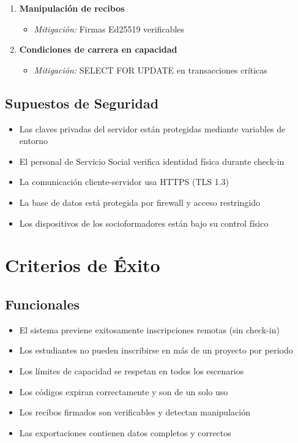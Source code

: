 \documentclass[12pt,a4paper]{article}
\begin{document}
\begin{enumerate}
    \item \textbf{Manipulación de recibos}
    \begin{itemize}
        \item \textit{Mitigación:} Firmas Ed25519 verificables
    \end{itemize}
    
    \item \textbf{Condiciones de carrera en capacidad}
    \begin{itemize}
        \item \textit{Mitigación:} SELECT FOR UPDATE en transacciones críticas
    \end{itemize}
\end{enumerate}

\subsection{Supuestos de Seguridad}

\begin{itemize}[leftmargin=*]
    \item Las claves privadas del servidor están protegidas mediante variables de entorno
    \item El personal de Servicio Social verifica identidad física durante check-in
    \item La comunicación cliente-servidor usa HTTPS (TLS 1.3)
    \item La base de datos está protegida por firewall y acceso restringido
    \item Los dispositivos de los socioformadores están bajo su control físico
\end{itemize}

\section{Criterios de Éxito}

\subsection{Funcionales}

\begin{itemize}[leftmargin=*]
    \item El sistema previene exitosamente inscripciones remotas (sin check-in)
    \item Los estudiantes no pueden inscribirse en más de un proyecto por periodo
    \item Los límites de capacidad se respetan en todos los escenarios
    \item Los códigos expiran correctamente y son de un solo uso
    \item Los recibos firmados son verificables y detectan manipulación
    \item Las exportaciones contienen datos completos y correctos
\end{itemize}
\end{document}

